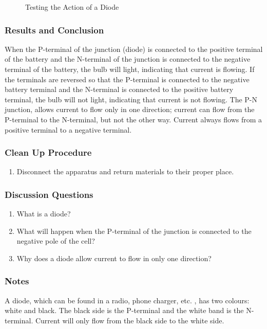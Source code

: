 \begin{figure}
\begin{center}
\def\svgwidth{150pt}

\caption{Testing the Action of a Diode}
\label{fig:diode}
\end{center}
\end{figure}

\subsubsection*{Results and Conclusion}
When the P-terminal of the junction (diode) is connected to the positive terminal of the battery and the N-terminal of the junction is connected to the negative terminal of the battery, the bulb will light, indicating that current is flowing.  
If the terminals are reversed so that the P-terminal is connected to the negative battery terminal and the N-terminal is connected to the positive battery terminal, the bulb will not light, indicating that current is not flowing.  
The P-N junction, allows current to flow only in one direction; current can flow from the P-terminal to the N-terminal, but not the other way.  
Current always flows from a positive terminal to a negative terminal.  

\subsubsection*{Clean Up Procedure}
\begin{enumerate}
\item{Disconnect the apparatus and return materials to their proper place.} 
\end{enumerate}

\subsubsection*{Discussion Questions}
\begin{enumerate}
\item{What is a diode?}
\item{What will happen when the P-terminal of the junction is connected to the negative pole of the cell?}
\item{Why does a diode allow current to flow in only one direction?}
\end{enumerate}

\subsubsection*{Notes}
A diode, which can be found in a radio, phone charger, etc.  , has two colours: white and black. The black side is the P-terminal and the white band is the N-terminal. Current will only flow from the black side to the white side.  

